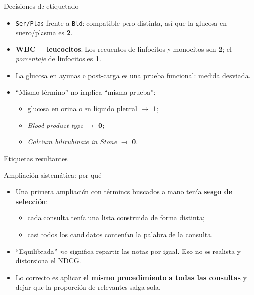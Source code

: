 \documentclass[aspectratio=169,11pt]{beamer}
\newcommand{\rel}[1]{\textbf{#1}}
\newcommand{\code}[1]{\texttt{#1}}
\begin{document}
\begin{frame}{Decisiones de etiquetado}
  \begin{itemize}
    \item \code{Ser/Plas} frente a \code{Bld}: compatible pero distinta, así que la glucosa en suero/plasma es \rel{2}.
    \item \textbf{WBC = leucocitos}. Los recuentos de linfocitos y monocitos son \rel{2}; el \emph{porcentaje} de linfocitos es \rel{1}.
    \item La glucosa en ayunas o post-carga es una prueba funcional: medida desviada.
    \item ``Mismo término'' no implica ``misma prueba'':
      \begin{itemize}
        \item glucosa en orina o en líquido pleural $\rightarrow$ \rel{1};
        \item \emph{Blood product type} $\rightarrow$ \rel{0};
        \item \emph{Calcium bilirubinate in Stone} $\rightarrow$ \rel{0}.
      \end{itemize}
  \end{itemize}
\end{frame}

\begin{frame}{Etiquetas resultantes}
  \centering\scriptsize
  \resizebox{\linewidth}{!}{}
\end{frame}

\begin{frame}{Ampliación sistemática: por qué}
  \begin{itemize}
    \item Una primera ampliación con términos buscados a mano tenía \textbf{sesgo de selección}:
      \begin{itemize}
        \item cada consulta tenía una lista construida de forma distinta;
        \item casi todos los candidatos contenían la palabra de la consulta.
      \end{itemize}
    \item ``Equilibrada'' \emph{no} significa repartir las notas por igual. Eso no es realista y distorsiona el NDCG.
    \item Lo correcto es aplicar \textbf{el mismo procedimiento a todas las consultas} y dejar que la proporción de relevantes salga sola.
  \end{itemize}
\end{frame}
\end{document}
